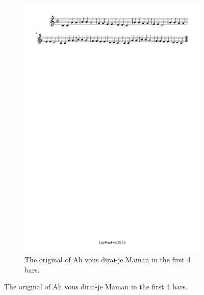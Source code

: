\documentclass[11pt]{article}
\theoremstyle{definition}
\begin{document}
\begin{figure}
\centering
\begin{subfigure}{\textwidth}
\centering
\includegraphics[trim=1cm 26.5cm 8.07cm 0.02cm, clip, scale=1]{dabby_1.pdf} %
\caption{The original of Ah vous dirai-je Maman in the first 4 bars.}
\label{fig:DabbyER1} 
\end{subfigure}


\end{figure}
\end{document}
